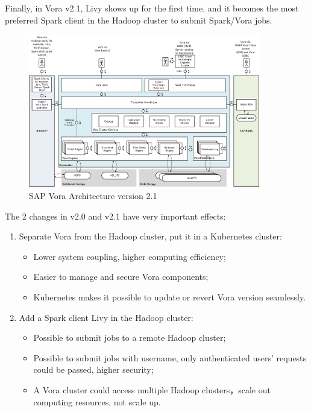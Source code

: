 \documentclass[article,colorback,accentcolor=tud4c]{tudreport}
\begin{document}
Finally, in Vora v2.1, Livy shows up for the first time, and it becomes the most preferred Spark client in the Hadoop cluster to submit Spark/Vora jobs.

\begin{figure}[!h]
	\centering
	\includegraphics[width=0.9\textwidth]{vora21}
	\caption{SAP Vora Architecture version 2.1}
\end{figure}

The 2 changes in v2.0 and v2.1 have very important effects:

\begin{enumerate}
	\item Separate Vora from the Hadoop cluster, put it in a Kubernetes cluster:
	\begin{itemize}
		\item Lower system coupling, higher computing efficiency;
		\item Easier to manage and secure Vora components;
		\item Kubernetes makes it possible to update or revert Vora version seamlessly.
	\end{itemize}
	\item Add a Spark client Livy in the Hadoop cluster:
	\begin{itemize}
		\item Possible to submit jobs to a remote Hadoop cluster;
		\item Possible to submit jobs with username, only authenticated users' requests could be passed, higher security;
		\item A Vora cluster could access multiple Hadoop clusters，scale out computing resources, not scale up.
	\end{itemize}
\end{enumerate}
\end{document}
